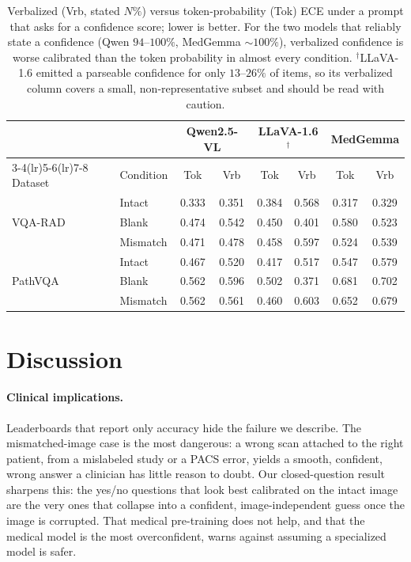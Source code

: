 \documentclass{article}
\begin{document}
\begin{table}[t]
\centering
\caption{Verbalized (Vrb, stated $N\%$) versus token-probability (Tok) ECE under a
prompt that asks for a confidence score; lower is better. For the two models that
reliably state a confidence (Qwen $94$--$100\%$, MedGemma ${\sim}100\%$), verbalized
confidence is worse calibrated than the token probability in almost every condition.
$^\dagger$LLaVA-1.6 emitted a parseable confidence for only $13$--$26\%$ of items, so
its verbalized column covers a small, non-representative subset and should be read
with caution.}
\label{tab:verbalized}
\small
\begin{tabular}{ll cc cc cc}
\toprule
& & \multicolumn{2}{c}{Qwen2.5-VL} & \multicolumn{2}{c}{LLaVA-1.6$^\dagger$}
  & \multicolumn{2}{c}{MedGemma} \\
\cmidrule(lr){3-4}\cmidrule(lr){5-6}\cmidrule(lr){7-8}
Dataset & Condition & Tok & Vrb & Tok & Vrb & Tok & Vrb \\
\midrule
\multirow{3}{*}{VQA-RAD} & Intact   & 0.333 & 0.351 & 0.384 & 0.568 & 0.317 & 0.329 \\
                         & Blank    & 0.474 & 0.542 & 0.450 & 0.401 & 0.580 & 0.523 \\
                         & Mismatch & 0.471 & 0.478 & 0.458 & 0.597 & 0.524 & 0.539 \\
\midrule
\multirow{3}{*}{PathVQA} & Intact   & 0.467 & 0.520 & 0.417 & 0.517 & 0.547 & 0.579 \\
                         & Blank    & 0.562 & 0.596 & 0.502 & 0.371 & 0.681 & 0.702 \\
                         & Mismatch & 0.562 & 0.561 & 0.460 & 0.603 & 0.652 & 0.679 \\
\bottomrule
\end{tabular}
\end{table}

\section{Discussion}
\paragraph{Clinical implications.} Leaderboards that report only accuracy hide the
failure we describe. The mismatched-image case is the most dangerous: a wrong scan
attached to the right patient, from a mislabeled study or a PACS error, yields a
smooth, confident, wrong answer a clinician has little reason to doubt. Our
closed-question result sharpens this: the yes/no questions that look best calibrated
on the intact image are the very ones that collapse into a confident,
image-independent guess once the image is corrupted. That medical pre-training does
not help, and that the medical model is the most overconfident, warns against
assuming a specialized model is safer.
\end{document}
